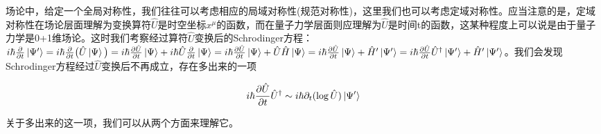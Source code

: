 \documentclass[a4paper]{article}
\begin{document}
        场论中，给定一个全局对称性，我们往往可以考虑相应的局域对称性(规范对称性)，这里我们也可以考虑定域对称性。应当注意的是，定域对称性在场论层面理解为变换算符$\hat{U}$是时空坐标$x^\mu$的函数，而在量子力学层面则应理解为$\hat{U}$是时间t的函数，这某种程度上可以说是由于量子力学是0+1维场论。这时我们考察经过算符$\hat{U}$变换后的Schrodinger方程：$i\hbar\frac{\partial}{\partial t}\ket{\Psi'} = i\hbar\frac{\partial}{\partial t}\big(\hat{U}\ket{\Psi}\big) = i\hbar\frac{\partial\hat{U}}{\partial t}\ket{\Psi} + i\hbar\hat{U}\frac{\partial}{\partial t}\ket{\Psi} = i\hbar\frac{\partial\hat{U}}{\partial t}\ket{\Psi} + \hat{U}\hat{H}\ket{\Psi} = i\hbar\frac{\partial\hat{U}}{\partial t}\ket{\Psi} + \hat{H}'\ket{\Psi'} = i\hbar\frac{\partial\hat{U}}{\partial t}\hat{U}^\dagger\ket{\Psi'} + \hat{H}'\ket{\Psi'}$。我们会发现Schrodinger方程经过$\hat{U}$变换后不再成立，存在多出来的一项
        
        \begin{equation}
            i\hbar\frac{\partial\hat{U}}{\partial t}\hat{U}^\dagger\sim i\hbar\partial_t(\log\hat{U})\ket{\Psi'}
        \end{equation}

        关于多出来的这一项，我们可以从两个方面来理解它。
\end{document}
